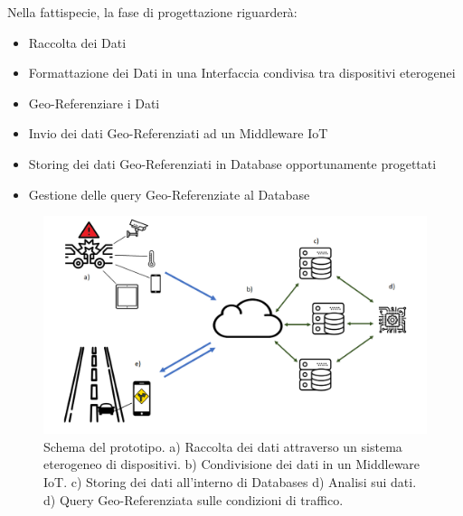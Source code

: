 Nella fattispecie, la fase di progettazione riguarderà:
\begin{itemize}
	\item Raccolta dei Dati
	\item Formattazione dei Dati in una Interfaccia condivisa tra dispositivi eterogenei
	\item Geo-Referenziare i Dati
	\item Invio dei dati Geo-Referenziati ad un Middleware IoT
	\item Storing dei dati Geo-Referenziati in Database opportunamente progettati
	\item Gestione delle query Geo-Referenziate al Database
\end{itemize} 
\begin{figure}
	\begin{center}
		\includegraphics[width=0.8\columnwidth]{images/schema_fin}
	\end{center}
	\caption{Schema del prototipo. a) Raccolta dei dati attraverso un sistema eterogeneo di dispositivi. b) Condivisione dei dati in un Middleware IoT. c) Storing dei dati all'interno di Databases d) Analisi sui dati. d) Query Geo-Referenziata sulle condizioni di traffico. }
	\label{fig:application_schema}
\end{figure}

